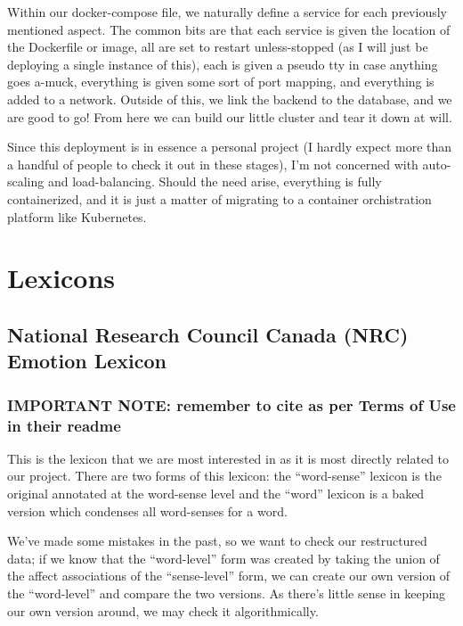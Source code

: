 \documentclass[11pt, twoside, reqno]{book}
\begin{document}
\label{The Composition}

Within our docker-compose file, we naturally define a service for each previously mentioned aspect. The common bits are that each service is given the location of the Dockerfile or image, all are set to restart unless-stopped (as I will just be deploying a single instance of this), each is given a pseudo tty in case anything goes a-muck, everything is given some sort of port mapping, and everything is added to a network. Outside of this, we link the backend to the database, and we are good to go! From here we can build our little cluster and tear it down at will.

Since this deployment is in essence a personal project (I hardly expect more than a handful of people to check it out in these stages), I'm not concerned with auto-scaling and load-balancing. Should the need arise, everything is fully containerized, and it is just a matter of migrating to a container orchistration platform like Kubernetes.

\chapter{Lexicons}


\section{National Research Council Canada (NRC) Emotion Lexicon}

\subsection{IMPORTANT NOTE: remember to cite as per Terms of Use in their readme}

This is the lexicon that we are most interested in as it is most directly related to our project. There are two forms of this lexicon: the ``word-sense'' lexicon is the original annotated at the word-sense level and the ``word'' lexicon is a baked version which condenses all word-senses for a word.

We've made some mistakes in the past, so we want to check our restructured data; if we know that the ``word-level'' form was created by taking the union of the affect associations of the ``sense-level'' form, we can create our own version of the ``word-level'' and compare the two versions. As there's little sense in keeping our own version around, we may check it algorithmically.
\end{document}
